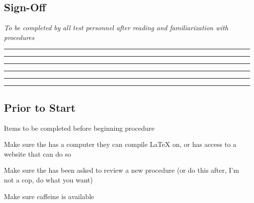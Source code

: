 \subsection{Sign-Off}
\textit{To be completed by all test personnel after reading and familiarization with procedures}
\begin{checklist}
    \item \authfull      \tabto{25em}\rule{10em}{0.4pt}\hspace{5em}\rule{10em}{0.4pt}
    \item \edifull      \tabto{25em}\rule{10em}{0.4pt}\hspace{5em}\rule{10em}{0.4pt}
    \item \perffull      \tabto{25em}\rule{10em}{0.4pt}\hspace{5em}\rule{10em}{0.4pt}
\end{checklist}
\setcounter{checklistnum}{0}

\subsection{Prior to Start}
\begin{checklist}
    \item Items to be completed before beginning procedure
    \begin{checklist}
        \item Make sure the \auth{} has a computer they can compile \LaTeX{} on, or has access to a website that can do so
        \item Make sure the \edi{} has been asked to review a new procedure (or do this after, I'm not a cop, do what you want)
        \item Make sure caffeine is available
    \end{checklist}
\end{checklist}
\setcounter{checklistnum}{0}

\newpage
